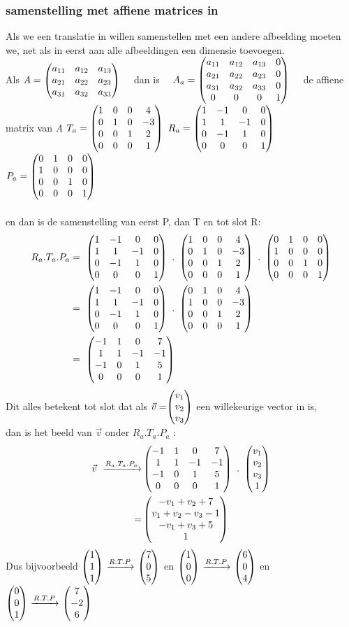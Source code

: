 \subsubsection{samenstelling met affiene matrices in \RD}
Als we een translatie in \RD willen samenstellen met een andere afbeelding moeten we, net als in \RT eerst aan alle afbeeldingen een dimensie toevoegen. \\ 
 {
	Als $ 	A = \begin{pmatrix} {}a_{11} & a_{12} & a_{13}  \\  a_{21} & a_{22}  &  a_{23} \\  a_{31} & a_{32} & a_{33} \end{pmatrix} $ \ \ 
	dan is \ \ 
	$  
	A_a = \begin{pmatrix} a_{11} & a_{12} & a_{13} & 0  \\  a_{21} & a_{22}  & a_{23} & 0  \\  a_{31} & a_{32} & a_{33} & 0 \\ 0 & 0 & 0 & 1  \end{pmatrix}  $ \ \  de affiene matrix van\textit{ A} } 
$ T_a = \begin{pmatrix}  1 & 0 & 0 & 4  \\  0 & 1 & 0 &-3  \\  0 & 0 & 1 & 2 \\ 0 & 0 & 0 & 1  \end{pmatrix} $  \qquad
$ R_a = \begin{pmatrix}  1 & -1 & 0 & 0  \\  1 & 1 & -1 & 0 \\  0 & -1 & 1  & 0 \\ 0 & 0 & 0 & 1  \end{pmatrix} $ \qquad
$ P_a = \begin{pmatrix}  0 & 1 & 0  & 0  \\  1 & 0 & 0 & 0  \\  0 & 0 & 1  & 0  \\ 0 & 0 & 0 & 1  \end{pmatrix} $ \\ \\
en dan is de samenstelling van eerst P, dan T en tot slot R:
\begin{align*} 
R_a . T_a . P_a & = \ 
\matvier{ 1 & -1 & 0 & 0 }
{ 1 & 1 & -1 & 0}
{ 0 & -1 & 1  & 0}
{0 & 0 & 0 & 1 }  \ . \ 
\matvier{ 1 & 0 & 0 & 4 }
{ 0 & 1 & 0 &-3 }
{ 0 & 0 & 1 & 2}
{0 & 0 & 0 & 1 }  \ . \ 
\matvier{ 0 & 1 & 0  & 0 }  
{ 1 & 0 & 0 & 0 }
{ 0 & 0 & 1  & 0 } 
{0 & 0 & 0 & 1 }  \\
& = \ \matvier { 1 & -1 & 0 & 0 }
{ 1 & 1 & -1 & 0}
{ 0 & -1 & 1  & 0}
{0 & 0 & 0 & 1 }  \ . \ 
\matvier{ 0 & 1 & 0 & 4 }
{ 1 & 0 & 0 &-3 }
{ 0 & 0 & 1 & 2}
{0 & 0 & 0 & 1 }   \\
& = \ \matvier{ -1 & 1 & 0 & 7 }
{ 1 & 1 & -1 & -1 }
{ -1 & 0 & 1 & 5}
{0 & 0 & 0 & 1 }  
\end{align*} 
Dit alles betekent tot slot dat als $\vec{v} = \vecdriesnel{v} $ een willekeurige vector in \RD is, \\dan is  het beeld van $ \vec{v} $ onder $  R_a. T_a . P_a $ :
\begin{align*} 
\vec{v}  \  \xrightarrow{R_a. T_a . P_a}   
&   \matvier{ -1 & 1 & 0 & 7 }
{ 1 & 1 & -1 & -1 }
{ -1 & 0 & 1 & 5}
{0 & 0 & 0 & 1 }  \ . \ 
\matvier{v_1}{v_2}{v_3}{1}  \\ 
=  & \matvier {-v_1+v_2+7} 
{ v_1+v_2-v_3 -1 }
{-v_1+v_3+ 5} {1} 
\end{align*}                        
Dus bijvoorbeeld $ \vecdrie{1}{1}{1}  \  \xrightarrow{R. T . P} \  \vecdrie{7}{0}{5}    $ \quad en  \quad 
$ \vecdrie{1}{0}{0}  \  \xrightarrow{R. T . P}  \ \vecdrie{6}{0}{4}  $ 
\quad en  \quad 
$ \vecdrie{0}{0}{1}  \  \xrightarrow{R. T . P}  \ \vecdrie{7}{-2}{6}  $ 

